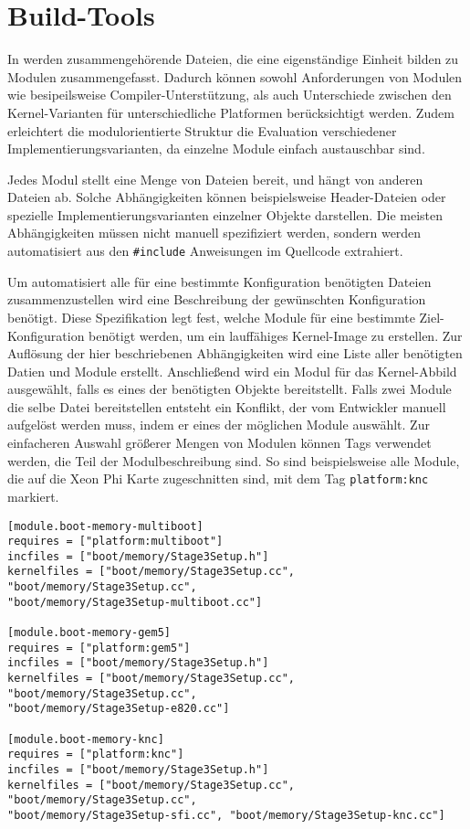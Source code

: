 \section{Build-Tools}

In \mythos werden zusammengehörende Dateien, die eine eigenständige Einheit 
bilden zu Modulen zusammengefasst. Dadurch können sowohl Anforderungen von 
Modulen wie besipeilsweise Compiler-Unterstützung, als auch Unterschiede 
zwischen den Kernel-Varianten für unterschiedliche Platformen berücksichtigt 
werden. Zudem erleichtert die modulorientierte Struktur die Evaluation 
verschiedener Implementierungsvarianten, da einzelne Module einfach 
austauschbar sind.

Jedes Modul stellt eine Menge von Dateien bereit, und hängt von anderen Dateien 
ab. Solche Abhängigkeiten können beispielsweise Header-Dateien oder spezielle 
Implementierungsvarianten einzelner Objekte darstellen. Die meisten 
Abhängigkeiten müssen nicht manuell spezifiziert werden, sondern werden 
automatisiert aus den \texttt{\#include} Anweisungen im Quellcode extrahiert.

Um automatisiert alle für eine bestimmte Konfiguration benötigten Dateien 
zusammenzustellen wird eine Beschreibung der gewünschten Konfiguration 
benötigt. Diese Spezifikation legt fest, welche Module für eine 
bestimmte Ziel-Konfiguration benötigt werden, um ein lauffähiges Kernel-Image 
zu erstellen.\newline
Zur Auflösung der hier beschriebenen Abhängigkeiten wird eine Liste aller 
benötigten Datien und Module erstellt. Anschließend wird ein Modul für das 
Kernel-Abbild ausgewählt, falls es eines der benötigten Objekte bereitstellt.
Falls zwei Module die selbe Datei bereitstellen entsteht ein Konflikt, der 
vom Entwickler manuell aufgelöst werden muss, indem er eines der möglichen 
Module auswählt. Zur einfacheren Auswahl größerer Mengen von Modulen können 
Tags verwendet werden, die Teil der Modulbeschreibung sind. So sind 
beispielsweise alle Module, die auf die Xeon Phi Karte zugeschnitten sind, mit 
dem Tag \texttt{platform:knc} markiert.

\begin{lstlisting}[float, label=lst:module, caption=Ein Beispiel einer 
Modulbeschreibung.]
[module.boot-memory-multiboot]
requires = ["platform:multiboot"]
incfiles = ["boot/memory/Stage3Setup.h"]
kernelfiles = ["boot/memory/Stage3Setup.cc", "boot/memory/Stage3Setup.cc", 
"boot/memory/Stage3Setup-multiboot.cc"]

[module.boot-memory-gem5]
requires = ["platform:gem5"]
incfiles = ["boot/memory/Stage3Setup.h"]
kernelfiles = ["boot/memory/Stage3Setup.cc", "boot/memory/Stage3Setup.cc", 
"boot/memory/Stage3Setup-e820.cc"]

[module.boot-memory-knc]
requires = ["platform:knc"]
incfiles = ["boot/memory/Stage3Setup.h"]
kernelfiles = ["boot/memory/Stage3Setup.cc", "boot/memory/Stage3Setup.cc", 
"boot/memory/Stage3Setup-sfi.cc", "boot/memory/Stage3Setup-knc.cc"]
\end{lstlisting}

